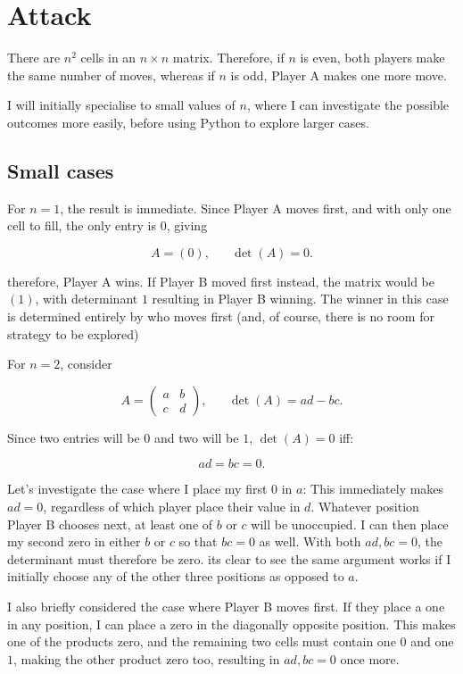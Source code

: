 \documentclass[11pt]{article}
\newcommand{\keywordfont}{\textsc}
\newcommand{\keyword}[1]{%
  \marginpar{\raggedright\small\keywordfont{#1}}}
\begin{document}
\section*{Attack}

There are $n^2$ cells in an $n\times n$ matrix. Therefore, if $n$ is even, both players make the same number of moves, whereas if $n$ is odd, Player A makes one more move.

I will initially specialise \keyword{Simplify} to small values of $n$, where I can investigate the possible outcomes more easily, before using Python to explore larger cases.

\subsection*{Small cases}

For $n=1$, the result is immediate. Since Player A moves first, and with only one cell to fill, the only entry is $0$, giving

$$
A=(0), \; \; \; \; \; \;  \det(A)=0.
$$

therefore, Player A wins. If Player B moved first instead, the matrix would be $(1)$, with determinant $1$ resulting in Player B winning. The winner in this case is determined entirely by who moves first (and, of course, there is no room for strategy to be explored)

For $n=2$, consider


$$
A=\begin{pmatrix}a&b\\c&d\end{pmatrix},
\; \; \; \; \; \;  \det(A)=ad-bc.
$$


Since two entries will be $0$ and two will be $1$, $\det(A) = 0$ iff:

$$
ad=bc=0.
$$

Let's investigate the case where I place my first $0$ in $a$: This immediately makes $ad=0$, regardless of which player place their value in $d$. Whatever position Player B chooses next, at least one of $b$ or $c$ will be unoccupied. I can then place my second zero in either $b$ or $c$ so that $bc=0$ as well. With both $ad, bc =0$, the determinant must therefore be zero. its clear to see the same argument works if I initially choose any of the other three positions as opposed to $a$.

I also briefly considered the case where Player B moves first. If they place a one in any position, I can place a zero in the diagonally opposite position. This makes one of the products zero, and the remaining two cells must contain one $0$ and one $1$, making the other product zero too, resulting in $ad, bc =0$ once more.
\end{document}
